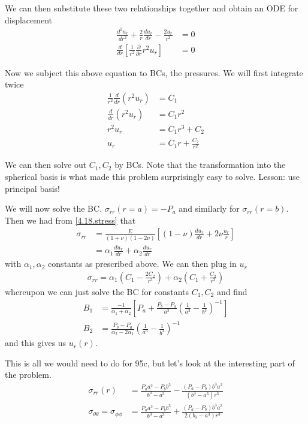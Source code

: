 \documentclass[10pt]{report}
\newcommand{\rtd}[2]{\frac{d^2#1}{d#2^2}}
\newcommand{\rd}[2]{\frac{d#1}{d#2}}
\newcommand{\pd}[2]{\frac{\partial #1}{\partial#2}}
\begin{document}
We can then substitute these two relationships together and obtain an ODE for displacement
\begin{align}
    \rtd{u_r}{r} + \frac{2}{r}\rd{u_r}{r} - \frac{2u_r}{r^2} &= 0\\
    \rd{}{r}\left[ \frac{1}{r^2}\pd{}{r}r^2 u_r \right] &= 0
\end{align}

Now we subject this above equation to BCs, the pressures. We will first integrate twice
\begin{align}
    \frac{1}{r^2}\rd{}{r}(r^2u_r) &= C_1\\
    \rd{}{r}(r^2u_r) &= C_1r^2\\
    r^2u_r &= C_1 r^3 + C_2\\
    u_r &= C_1r + \frac{C_2}{r^2}
\end{align}

We can then solve out $C_1, C_2$ by BCs. Note that the transformation into the spherical basis is what made this problem surprisingly easy to solve. Lesson: use principal basis!

We will now solve the BC. $\sigma_{rr}(r=a) = -P_a$ and similarly for $\sigma_{rr}(r=b)$. Then we had from \eqref{4.18.stress} that
\begin{align}
    \sigma_{rr} &= \frac{E}{(1+\nu)(1-2\nu)}\left[ (1-\nu)\rd{u_r}{r} + 2\nu\frac{u_r}{r} \right] \\
    &= \alpha_1\rd{u_r}{r} + \alpha_2 \rd{u_r}{r}
\end{align}
with $\alpha_1, \alpha_2$ constants as prescribed above. We can then plug in $u_r$
\begin{align}
    \sigma_{rr} = \alpha_1\left( C_1 - \frac{2C_2}{r^3} \right) + \alpha_2\left( C_1 + \frac{C_2}{r^3} \right)
\end{align}
whereupon we can just solve the BC for constants $C_1, C_2$ and find
\begin{align}
    B_1 &= \frac{-1}{\alpha_1 + \alpha_2}\left[ P_a + \frac{P_b - P_a}{a^3}\left( \frac{1}{a^3} - \frac{1}{b^3} \right)^{-1} \right]\\
    B_2 &= \frac{P_b - P_a}{\alpha_2 - 2\alpha_1}\left( \frac{1}{a^3} - \frac{1}{b^3} \right)^{-1}
\end{align}
and this gives us $u_r(r)$. 

This is all we would need to do for 95c, but let's look at the interesting part of the problem. 
\begin{align}
    \sigma_{rr}(r) &= \frac{P_aa^3 - P_bb^3}{b^3 - a^3} - \frac{(P_a - P_b)b^3a^2}{(b^3 - a^3)r^3}\\
    \sigma_{\theta\theta} = \sigma_{\phi\phi} &= \frac{P_aa^3 - P_bb^3}{b^3 - a^3} + \frac{(P_a - P_b)b^3a^3}{2(b_3 - a^3)r^3}
\end{align}
\end{document}
